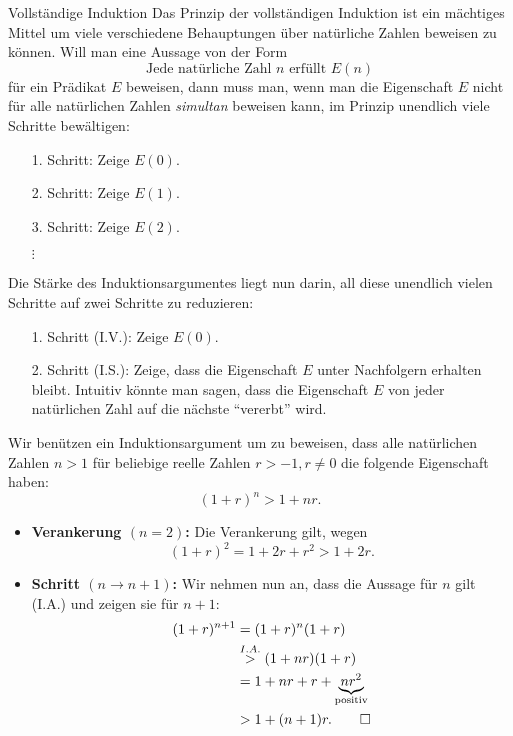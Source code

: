 \begin{howto}{Vollständige Induktion}
    Das Prinzip der vollständigen Induktion ist ein mächtiges Mittel um viele verschiedene Behauptungen über natürliche Zahlen beweisen zu können. Will man eine Aussage von der Form
    \[
        \text{Jede natürliche Zahl }n\text{ erfüllt }E(n)
    \]
    für ein Prädikat $E$ beweisen, dann muss man, wenn man die Eigenschaft $E$ nicht für alle natürlichen Zahlen \textit{simultan} beweisen kann, im Prinzip unendlich viele Schritte bewältigen:
    \begin{enumerate}
        \item[1.] Schritt: Zeige $E(0)$.
        \item[2.] Schritt: Zeige $E(1)$.
        \item[3.] Schritt: Zeige $E(2)$.
        \item[$\vdots$]
    \end{enumerate}
    Die Stärke des Induktionsargumentes liegt nun  darin, all diese unendlich vielen Schritte auf zwei Schritte zu reduzieren:
    \begin{enumerate}
        \item[1.] Schritt (I.V.): Zeige $E(0)$.
        \item[2.] Schritt (I.S.): Zeige, dass die Eigenschaft $E$ unter Nachfolgern erhalten bleibt. Intuitiv könnte man sagen, dass die Eigenschaft $E$ von jeder natürlichen Zahl auf die nächste ``vererbt'' wird.
    \end{enumerate}
\end{howto}

\begin{example}
    Wir benützen ein Induktionsargument um zu beweisen, dass alle natürlichen Zahlen $n>1$ für beliebige reelle Zahlen $r>-1, r\neq 0$ die folgende Eigenschaft haben:
    \[
        (1+r)^n>1+nr.
    \]
    \tcblower
    \begin{itemize}
        \item \textbf{Verankerung $(n=2)$:} Die Verankerung gilt, wegen
            \[
                (1+r)^2=1+2r+r^2>1+2r.
            \]
        \item \textbf{Schritt $(n\to n+1)$:} Wir nehmen nun an, dass die Aussage für $n$ gilt (I.A.) und zeigen sie für $n+1$:
            \begin{align*}
                (1+r)^{n+1}&=(1+r)^n(1+r)\\
                &\stackrel{I.A.}{>}(1+nr)(1+r)\\
                &=1+nr+r+\underbrace{nr^2}_{\text{positiv}}\\
                &>1+(n+1)r.\qedhere
            \end{align*}
    \end{itemize}
\end{example}

